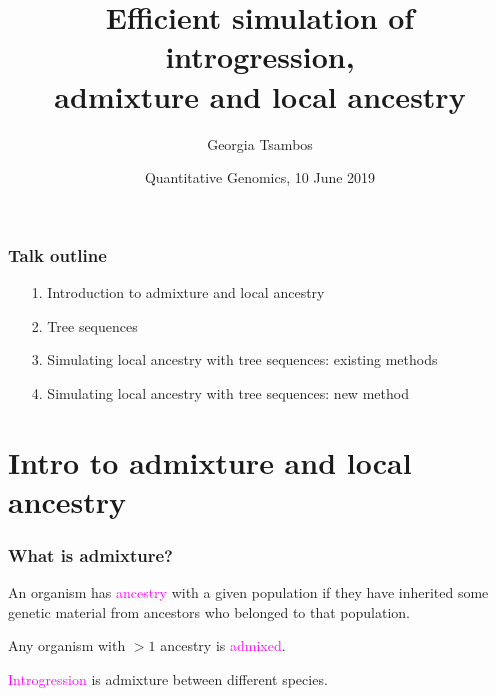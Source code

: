 \documentclass[11pt, mathserif, aspectratio=169]{beamer}
\title{Efficient simulation of introgression,\\ admixture and local ancestry}
\author{Georgia Tsambos}
\institute{{\normalsize University of Melbourne, Australia}}
\date{Quantitative Genomics, 10 June 2019}
\newcommand{\magenta}[1]{\textcolor{magenta}{#1}}
\newenvironment{wideitemize}{\itemize\addtolength{\itemsep}{10pt}}{\enditemize}
\begin{document}
\maketitle

\begin{frame}
\frametitle{Talk outline}

\begin{enumerate}
\itemsep7mm
\item[1. ] Introduction to admixture and local ancestry
\item[2. ] Tree sequences
\item[3. ] Simulating local ancestry with tree sequences: existing methods
\item[4. ] Simulating local ancestry with tree sequences: new method
\end{enumerate}
\end{frame}

\section{Intro to admixture and local ancestry}


\begin{frame}
\frametitle{What is admixture?}
%

\begin{wideitemize}
    \item An organism has \magenta{ancestry} with a given population if they have inherited some genetic material from ancestors who belonged to that population. 
    \item Any organism with $>1$ ancestry is \magenta{admixed}.
    \item \magenta{Introgression} is admixture between different species.
\end{wideitemize}

\end{frame}
\end{document}
